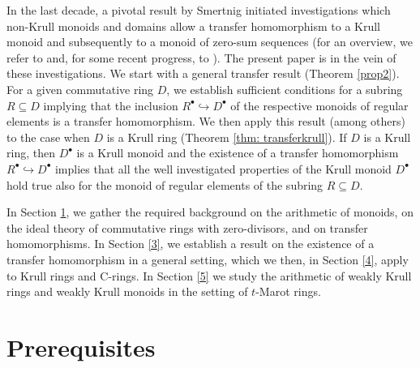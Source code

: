 \documentclass[a4paper, 10pt]{amsart}
\theoremstyle{plain}
\theoremstyle{definition}
\theoremstyle{remark}
\numberwithin{equation}{section}
\begin{document}
In the last decade, a pivotal result by Smertnig \cite{Sme13} initiated investigations which non-Krull monoids and domains allow a transfer homomorphism to a Krull monoid and subsequently to a monoid of zero-sum sequences (for an overview, we refer to \cite{BR22, GZ20} and, for some recent progress,  to \cite{Rag25}). The present paper is in the vein of these investigations. We start with a general transfer result (Theorem \ref{prop2}). For a given commutative ring $D$, we establish sufficient conditions for a subring $R \subseteq D$ implying that the inclusion $R^{\bullet} \hookrightarrow D^{\bullet}$ of the respective monoids of regular elements is a transfer homomorphism. We then apply this result (among others) to the case when $D$ is a Krull ring (Theorem \ref{thm: transferkrull}). If $D$ is a Krull ring, then $D^{\bullet}$ is a Krull monoid and the existence of a transfer homomorphism $R^{\bullet} \hookrightarrow D^{\bullet}$ implies that all the well investigated properties of the Krull monoid $D^{\bullet}$ hold true also for the monoid of regular elements of the subring $R \subseteq D$.

In Section \ref{2}, we gather the required background on the arithmetic of monoids, on the ideal theory of commutative rings with zero-divisors, and on transfer homomorphisms. In Section \ref{3}, we establish a result on the existence of a transfer homomorphism in a general setting, which we then, in Section \ref{4},  apply to Krull rings and C-rings. In Section \ref{5} we study the arithmetic of weakly Krull rings and weakly Krull monoids in the setting of $t$-Marot rings.
\section{Prerequisites} \label{2}
\smallskip
\end{document}
